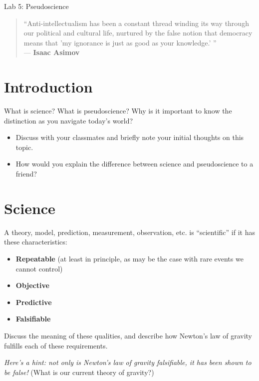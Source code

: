 \documentclass[11pt]{article}
\begin{document}
\begin{center}
\huge{Lab 5: Pseudoscience}\\ \medskip 
\end{center}


\begin{quote}
``Anti-intellectualism has been a constant thread winding its way through our political and cultural life, nurtured by the false notion that democracy means that 'my ignorance is just as good as your knowledge.' '' \\
\hfill --- \textbf{Isaac Asimov}
\end{quote}

\vspace{0.5cm}

\section{Introduction}
What is science? What is pseudoscience? Why is it important to know the distinction as you navigate today's world?
\begin{itemize}
    \item Discuss with your classmates and briefly note your initial thoughts on this topic.
    \item How would you explain the difference between science and pseudoscience to a friend?
\end{itemize}

\section{Science}
A theory, model, prediction, measurement, observation, etc. is ``scientific'' if it has these characteristics:
\begin{itemize}
    \item \textbf{Repeatable} (at least in principle, as may be the case with rare events we cannot control)
    \item \textbf{Objective}
    \item \textbf{Predictive}
    \item \textbf{Falsifiable}
\end{itemize}

Discuss the meaning of these qualities, and describe how Newton's law of gravity fulfills each of these requirements.

\textit{Here's a hint: not only is Newton's law of gravity falsifiable, it has been shown to be false!} (What is our current theory of gravity?)
\end{document}
